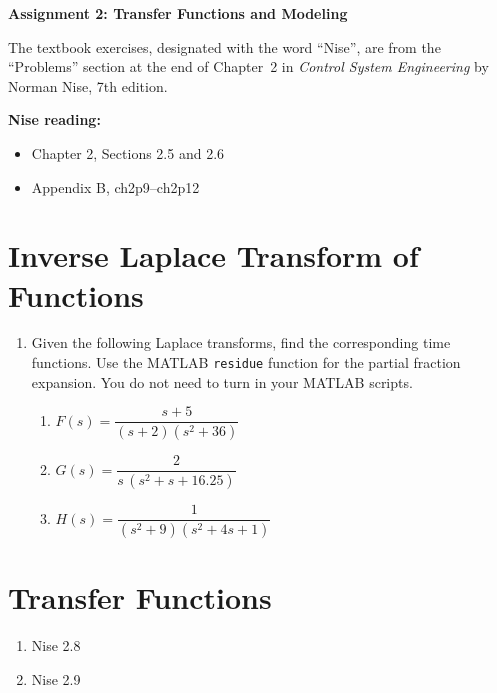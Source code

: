 \documentclass[11pt]{article}
\begin{document}
\begin{center}
  \Large{\bf{Assignment 2: Transfer Functions and Modeling}}
\end{center}

The textbook exercises, designated with the word ``Nise'', are from the ``Problems'' section at the end of Chapter~2 in \emph{Control System Engineering} by Norman Nise, 7th edition.

\textbf{Nise reading:}
\begin{itemize}[nosep]
  \item Chapter 2, Sections 2.5 and 2.6
  \item Appendix B, ch2p9--ch2p12
\end{itemize}

\section*{Inverse Laplace Transform of Functions}

\begin{enumerate}

\item Given the following Laplace transforms, find the corresponding time functions.  Use the MATLAB \texttt{residue} function for the partial fraction expansion.  You do not need to turn in your MATLAB scripts.
  \begin{enumerate}[label=\alph*)]
    \item $F(s) = \dfrac{s+5}{(s+2)(s^2+36)}$
    \item $G(s) = \dfrac{2}{s\,(s^2+s+16.25)}$
    \item $H(s) = \dfrac{1}{(s^2+9)(s^2+4s+1)}$
  \end{enumerate}

\end{enumerate}

\section*{Transfer Functions}

\begin{enumerate}[resume]

\item Nise 2.8

\item Nise 2.9

\end{enumerate}
\end{document}
